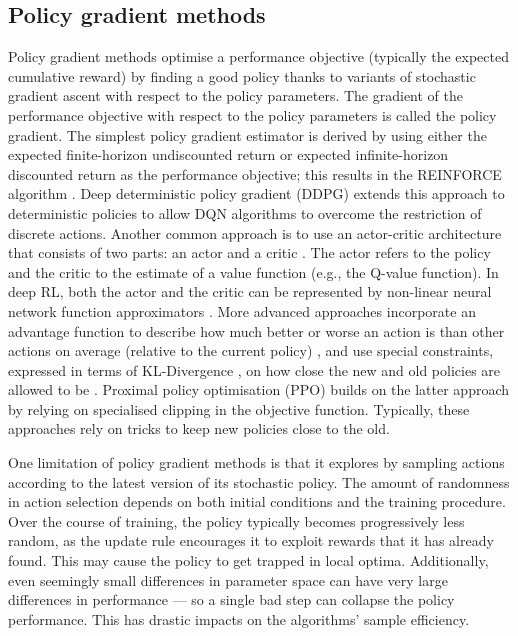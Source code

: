 \documentclass[12pt,a4paper]{article}
\begin{document}
\subsection{Policy gradient methods}
Policy gradient methods optimise a performance objective (typically the expected cumulative reward) by finding a good policy thanks to variants of stochastic gradient ascent with respect to the policy parameters. The gradient of the performance objective with respect to the policy parameters is called the policy gradient. The simplest policy gradient estimator is derived by using either the expected finite-horizon undiscounted return or expected infinite-horizon discounted return as the performance objective; this results in the REINFORCE algorithm \cite{Williams1992}. Deep deterministic policy gradient (DDPG) \cite{lillicrap2019continuous} extends this approach to deterministic policies to allow DQN algorithms to overcome the restriction of discrete actions. Another common approach is to use an actor-critic architecture that consists of two parts: an actor and a critic \cite{Konda2000}. The actor refers to the policy and the critic to the estimate of a value function (e.g., the Q-value function). In deep RL, both the actor and the critic can be represented by non-linear neural network function approximators \cite{mnih2016asynchronous}. More advanced approaches incorporate an advantage function to describe how much better or worse an action is than other actions on average (relative to the current policy) \cite{schulman2018highdimensional}, and use special constraints, expressed in terms of KL-Divergence \cite{kullback1951information}, on how close the new and old policies are allowed to be \cite{DBLP:journals/corr/SchulmanLMJA15}. Proximal policy optimisation (PPO) \cite{DBLP:journals/corr/SchulmanWDRK17} builds on the latter approach by relying on specialised clipping in the objective function. Typically, these approaches rely on tricks to keep new policies close to the old. 

One limitation of policy gradient methods is that it explores by sampling actions according to the latest version of its stochastic policy. The amount of randomness in action selection depends on both initial conditions and the training procedure. Over the course of training, the policy typically becomes progressively less random, as the update rule encourages it to exploit rewards that it has already found. This may cause the policy to get trapped in local optima. Additionally, even seemingly small differences in parameter space can have very large differences in performance --- so a single bad step can collapse the policy performance. This has drastic impacts on the algorithms' sample efficiency.
\end{document}
